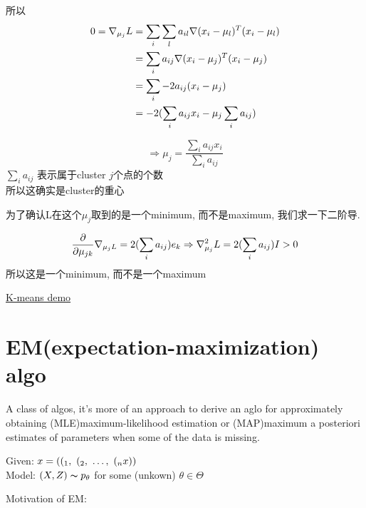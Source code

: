 \documentclass{article}
\begin{document}
所以
$$
\begin{aligned}
0 = \nabla _{\mu_j}{L}
&= \sum_i \sum_l a_{il} \nabla (x_i - \mu_l)^T (x_i - \mu_l) \\
&= \sum_i a_{ij} \nabla (x_i - \mu_j)^T (x_i - \mu_j) \\
&= \sum_i -2a_{ij} (x_i - \mu_j) \\
&= -2(\sum_i a_{ij}x_i - \mu_j \sum_i a_{ij})
\end{aligned}
$$

$$
\Rightarrow
\mu_j = \dfrac{\sum_i a_{ij}x_i}{\sum_i a_{ij}}
$$
$\sum_i a_{ij}$  表示属于cluster $j$个点的个数\\
所以这确实是cluster的重心

为了确认L在这个$\mu_j$取到的是一个minimum, 而不是maximum, 我们求一下二阶导.

$$
\frac{\partial }{\partial \mu_{jk}} \nabla _{\mu_{j} L}
= 2(\sum_i a_{ij}) e_k
\Rightarrow
\nabla ^2_{\mu_j} L = 2(\sum_i a_{ij})I > 0
$$
所以这是一个minimum, 而不是一个maximum

\href{https://www.youtube.com/watch?v=zHbxbb2ye3E}{K-means demo}

\section{EM(expectation-maximization) algo}
A class of algos,
it's more of an approach to derive an aglo for approximately obtaining (MLE)maximum-likelihood estimation or (MAP)maximum a posteriori estimates of parameters
when some of the data is missing.

Given: $x = ((_1,~(_2,~\ldots,~(_nx))$\\
Model: $(X, Z) \thicksim{p}_\theta$ for some (unkown) $\theta \in \Theta$

Motivation of EM:
\end{document}
